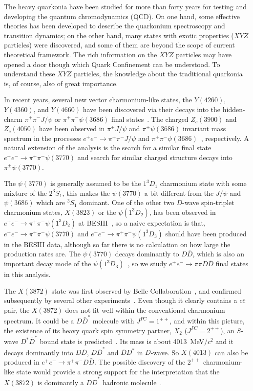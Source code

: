 \documentclass[aps,preprint,superscriptaddress,12pt,tightenlines]{revtex4}
\newcommand{\pspp}{\psi(3770)}
\newcommand{\EE}{e^+e^-}
\newcommand{\pp}{\pi^+\pi^-}
\begin{document}
The heavy quarkonia have been studied for more than forty years
for testing and developing the quantum chromodynamics (QCD). On
one hand, some effective theories has been developed to describe
the quarkonium spectroscopy and transition dynamics; on the other
hand, many states with exotic properties ($XYZ$ particles) were
discovered, and some of them are beyond the scope of current
theoretical framework. The rich information on the $XYZ$ particles
may have opened a door though which Quark Confinement can be
understood. To understand these $XYZ$ particles, the knowledge
about the traditional quarkonia is, of course, also of great
importance.

In recent years, several new vector charmonium-like states, the
$Y(4260)$, $Y(4360)$, and $Y(4660)$ have been discovered via their
decays into the hidden-charm $\pi^{+}\pi^{-}J/\psi$ or
$\pi^{+}\pi^{-}\psi(3686)$ final states~\cite{BabarY4260,
BabarY4360, BELLEY4260, BELLEY4360}. The charged $Z_{c}(3900)$ and
$Z_{c}(4050)$ have been observed in $\pi^{\pm}J/\psi$ and
$\pi^{\pm}\psi(3686)$ invariant mass spectrum in the processes
$e^{+}e^{-}\to \pi^{+}\pi^{-}J/\psi$ and
$\pp\psi(3686)$~\cite{zc3900, BELLEY4260, BELLEY4360},
respectively. A natural extension of the analysis is the search
for a similar final state $\EE\to \pi^{+}\pi^{-}\psi(3770)$ and
search for similar charged structure decays into
$\pi^{\pm}\psi(3770)$.

The $\psi(3770)$ is generally assumed to be the $1^{3}D_{1}$
charmonium state with some mixture of the $2^{3}S_{1}$, this makes
the $\psi(3770)$ a bit different from the $J/\psi$ and
$\psi(3686)$ which are $^{3}S_{1}$ dominant. One of the other two
$D$-wave spin-triplet charmonium states, $X(3823)$ or the
$\psi(1^{3}D_{2})$, has been observed in $\EE\to
\pp\psi(1^{3}D_{2})$ at BESIII~\cite{X3823}, so a naive
expectation is that, $\EE\to \pp \pspp$ and $\EE\to \pp
\psi(1^3D_3)$ should have been produced in the BESIII data,
although so far there is no calculation on how large the production
rates are. The $\psi(3770)$ decays dominantly to $D\bar{D}$, which
is also an important decay mode of the
$\psi(1^{3}D_{3})$~\cite{Highercharmonia}, so we study $\EE\to
\pi\pi D\bar{D}$ final states in this analysis.

The $X(3872)$ state was first observed by Belle Collaboration~\cite{X3872}, and
confirmed subsequently by several other
experiments~\cite{CDFX3872,D0X3872,BABARX3872}. Even though it
clearly contains a $c\bar{c}$ pair, the $X(3872)$ does not fit
well within the conventional charmonium spectrum. It could be a
$D\bar{D}^{*}$ molecule with $J^{PC} = 1^{++}$, and within this
picture, the existence of its heavy quark spin symmetry partner,
$X_{2}$ ($J^{PC} = 2^{++}$), an $S$-wave $D^{*}\bar{D}^{*}$ bound
state is predicted~\cite{PRD056004,PRD076006}. Its mass is about
4013~MeV/$c^2$ and it decays dominantly into $D\bar{D}$,
$D\bar{D}^{*}$ and $\bar{D}D^{*}$ in $D$-wave. So $X(4013)$ can
also be produced in $e^{+}e^{-}\to \pi^{+}\pi^{-} D\bar{D}$. The
possible discovery of the $2^{++}$ charmonium-like state would
provide a strong support for the interpretation that the $X(3872)$
is dominantly a $D\bar{D}^{*}$ hadronic
molecule~\cite{DecaywidthX4013}.
\end{document}
